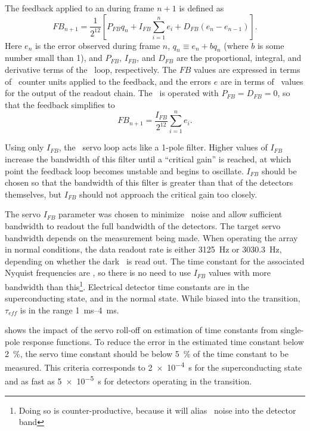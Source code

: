 The feedback applied to an  during frame $n+1$ is defined as \cite{mce_team_data_2013}
\begin{equation}
  FB_{n+1} = \frac{1}{2^{12}} \left[P_{FB} q_n + I_{FB} \sum_{i=1}^n e_i + D_{FB} (e_n - e_{n-1}) \right].
\end{equation}
Here $e_n$ is the error observed during frame $n$, $q_n \equiv e_n + b q_n$ (where $b$ is some number small than 1), and $P_{FB}$, $I_{FB}$, and $D_{FB}$ are the proportional, integral, and derivative terms of the \PID\ loop, respectively.
The $FB$ values are expressed in terms of \DAC\ counter units applied to the  feedback, and the errors $e$ are in terms of \ADC\ values for the output of the readout chain.
The \Imager\ is operated with $P_{FB} = D_{FB} = 0$, so that the feedback simplifies to
\begin{equation} \label{eqn:mce-pid-i-only}
  FB_{n+1} = \frac{I_{FB}}{2^{12}} \sum_{i=1}^n e_i.
\end{equation}

Using only $I_{FB}$, the \MCE\ servo loop acts like a 1-pole filter.
Higher values of $I_{FB}$ increase the bandwidth of this filter until a ``critical gain'' is reached, at which point the feedback loop becomes unstable and begins to oscillate.
$I_{FB}$ should be chosen so that the bandwidth of this filter is greater than that of the detectors themselves, but $I_{FB}$ should not approach the critical gain too closely.

The servo $I_{FB}$ parameter was chosen to minimize \SQUID\ noise and allow sufficient bandwidth to readout the full bandwidth of the detectors.
The target servo bandwidth depends on the measurement being made.
When operating the array in normal conditions, the data readout rate is either \SI{3125}{Hz} or \SI{3030.3}{Hz}, depending on whether the dark \SQUID\ is read out.
The time constant for the associated Nyquist frequencies are , so there is no need to use $I_{FB}$ values with more bandwidth than this\footnote{Doing so is counter-productive, because it will alias \SQUID\ noise into the detector band}.
Electrical detector time constants are  in the superconducting state, and  in the normal state.
While biased into the transition, $\tau_{eff}$ is in the range \SIrange{1}{4}{ms}.

 shows the impact of the servo roll-off on estimation of time constants from single-pole response functions.
To reduce the error in the estimated time constant below \SI{2}{\percent}, the servo time constant should be below \SI{5}{\percent} of the time constant to be measured.
This criteria corresponds to \SI{2e-4}{s} for the superconducting state and as fast as \SI{5e-5}{s} for detectors operating in the transition.

